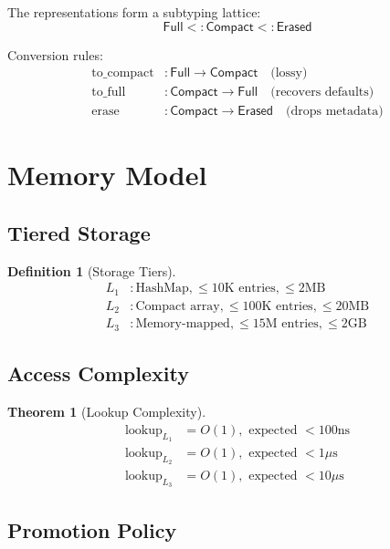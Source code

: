 \documentclass[11pt]{article}
\newtheorem{definition}{Definition}
\newtheorem{theorem}{Theorem}
\newcommand{\Full}{\mathsf{Full}}
\newcommand{\Compact}{\mathsf{Compact}}
\newcommand{\Erased}{\mathsf{Erased}}
\begin{document}
The representations form a subtyping lattice:
\[
\Full <: \Compact <: \Erased
\]

Conversion rules:
\begin{align*}
\text{to\_compact} &: \Full \to \Compact \quad \text{(lossy)} \\
\text{to\_full} &: \Compact \to \Full \quad \text{(recovers defaults)} \\
\text{erase} &: \Compact \to \Erased \quad \text{(drops metadata)}
\end{align*}

\section{Memory Model}

\subsection{Tiered Storage}

\begin{definition}[Storage Tiers]
\begin{align*}
L_1 &: \text{HashMap}, \leq 10\text{K entries}, \leq 2\text{MB} \\
L_2 &: \text{Compact array}, \leq 100\text{K entries}, \leq 20\text{MB} \\
L_3 &: \text{Memory-mapped}, \leq 15\text{M entries}, \leq 2\text{GB}
\end{align*}
\end{definition}

\subsection{Access Complexity}

\begin{theorem}[Lookup Complexity]
\begin{align*}
\text{lookup}_{L_1} &= O(1), \text{ expected } < 100\text{ns} \\
\text{lookup}_{L_2} &= O(1), \text{ expected } < 1\mu\text{s} \\
\text{lookup}_{L_3} &= O(1), \text{ expected } < 10\mu\text{s}
\end{align*}
\end{theorem}

\subsection{Promotion Policy}
\end{document}
